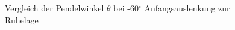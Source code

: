 \begin{figure}[H]
   \centering
   \caption[Vergleich der Pendelwinkel $\theta$ - große Auslenkung]{Vergleich der Pendelwinkel $\theta$ bei -60${^\circ}$ Anfangsauslenkung zur Ruhelage}
   \label{fig:Bild4.5}
\end{figure}
